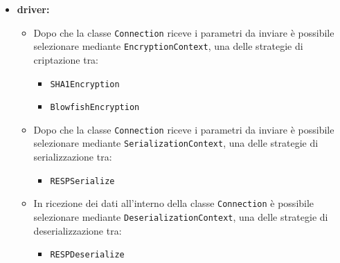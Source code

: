\documentclass{scalatekids-article}
\begin{document}
\begin{itemize}
\begin{itemize}
  \item \bf{driver:}
    \begin{itemize}
    \item Dopo che la classe \verb=Connection= riceve i parametri da inviare è
      possibile selezionare mediante \verb=EncryptionContext=, una delle
      strategie di criptazione tra:
      \begin{itemize}
      \item \verb=SHA1Encryption=
      \item \verb=BlowfishEncryption=
      \end{itemize}
    \end{itemize}
    \begin{itemize}
    \item Dopo che la classe \verb=Connection= riceve i parametri da inviare è
      possibile selezionare mediante \verb=SerializationContext=, una delle
      strategie di serializzazione tra:
      \begin{itemize}
      \item \verb=RESPSerialize=
      \end{itemize}
    \end{itemize}
    \begin{itemize}
    \item In ricezione dei dati all'interno della classe \verb=Connection= è
      possibile selezionare mediante \verb=DeserializationContext=, una delle
      strategie di deserializzazione tra:
      \begin{itemize}
      \item \verb=RESPDeserialize=
      \end{itemize}
    \end{itemize}


\end{itemize}
\end{itemize}
\end{document}
